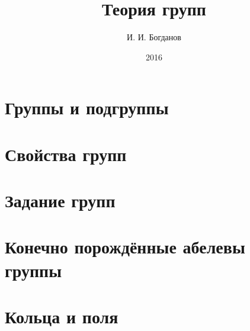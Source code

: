 \documentclass[a4paper, twoside]{extreport}
\title{Теория групп}
\author{И. И. Богданов}
\date{2016}
\begin{document}
\large

\maketitle
\thispagestyle{fancy}

\tableofcontents
\thispagestyle{fancy}

\chapter{Группы и подгруппы}






\chapter{Свойства групп}








\chapter{Задание групп}


\chapter{Конечно порождённые абелевы группы}



\chapter{Кольца и поля}

\end{document}
